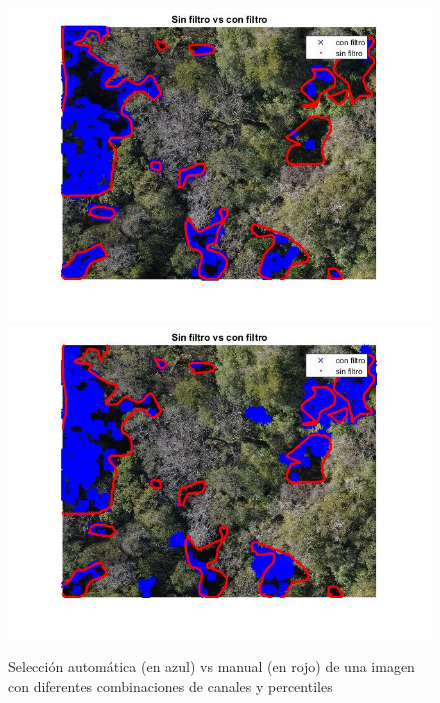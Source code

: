 \begin{figure}
    \includegraphics[width=.3\textwidth]{Imagenes/IIC/p90/BG/190a.jpg}\hfill
    \includegraphics[width=.3\textwidth]{Imagenes/IIC/p90/GR/190a.jpg}\hfill
    
    \caption{Selección automática (en azul) vs manual (en rojo) de una imagen con diferentes combinaciones de canales y percentiles}
\end{figure}\label{dji190}

